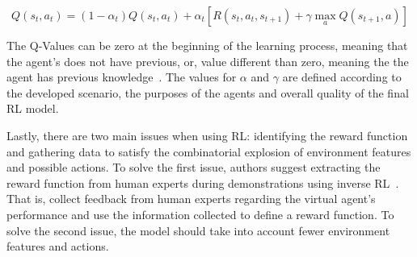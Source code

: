\vspace{-4mm}
\begin{equation}
	Q(s_t,a_t) = (1-\alpha_t)Q(s_t,a_t) + \alpha_t\left[R(s_t,a_t,s_{t+1}) + \gamma\max_{a}Q(s_{t+1},a)\right]
	\label{eq:QLearning}
\end{equation}

The Q-Values can be zero at the beginning of the learning process, meaning that the agent's does not have previous, or, value different than zero, meaning the the agent has previous knowledge~\cite{Malfaz2011}. The values for $\alpha$ and $\gamma$ are defined according to the developed scenario, the purposes of the agents and overall quality of the final \ac{RL} model.

Lastly, there are two main issues when using \ac{RL}: identifying the reward function and gathering data to satisfy the combinatorial explosion of environment features and possible actions. To solve the first issue, authors suggest extracting the reward function from human experts during demonstrations using inverse \ac{RL}~\cite{Ng2000, Thomaz2006}. That is, collect feedback from human experts regarding the virtual agent's performance and use the information collected to define a reward function. To solve the second issue, the model should take into account fewer environment features and actions.